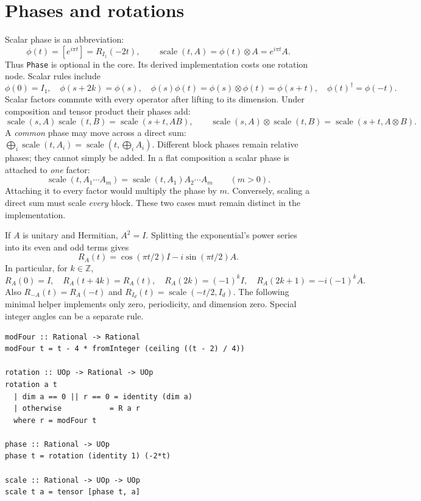 \documentclass[11pt,a4paper]{article}
\newcommand{\code}[1]{\texttt{#1}}
\newcommand{\Rot}[2]{R_{#1}(#2)}
\newcommand{\Ph}[1]{\phi(#1)}
\begin{document}
\section{Phases and rotations}

\label{sec:phases}

Scalar phase is an abbreviation:
\[
 \Ph t=[e^{i\pi t}]=\Rot{I_1}{-2t},
 \qquad \operatorname{scale}(t,A)=\Ph t\otimes A=e^{i\pi t}A.
\]
Thus \code{Phase} is optional in the core. Its derived implementation
costs one rotation node. Scalar rules include
\[
 \Ph0=I_1,\quad \Ph{s+2k}=\Ph s,\quad
 \Ph s\Ph t=\Ph s\otimes\Ph t=\Ph{s+t},\quad
 \Ph t^\dagger=\Ph{-t}.
\]
Scalar factors commute with every operator after lifting to its
dimension. Under composition and tensor product their phases add:
\[
 \operatorname{scale}(s,A)\operatorname{scale}(t,B)
   =\operatorname{scale}(s+t,AB),\qquad
 \operatorname{scale}(s,A)\otimes\operatorname{scale}(t,B)
   =\operatorname{scale}(s+t,A\otimes B).
\]
A \emph{common} phase may move across a direct sum:
$\bigoplus_i\operatorname{scale}(t,A_i)
=\operatorname{scale}(t,\bigoplus_i A_i)$.
Different block phases remain relative phases; they cannot simply be added.
In a flat composition a scalar phase is attached to \emph{one} factor:
\[
 \operatorname{scale}(t,A_1\cdots A_m)
 =\operatorname{scale}(t,A_1)A_2\cdots A_m\qquad(m>0).
\]
Attaching it to every factor would multiply the phase by $m$. Conversely,
scaling a direct sum must scale \emph{every} block. These two cases must
remain distinct in the implementation.

If $A$ is unitary and Hermitian, $A^2=I$. Splitting the exponential's
power series into its even and odd terms gives
\begin{equation}
 \Rot A t=\cos(\pi t/2)I-i\sin(\pi t/2)A. \label{eq:involution-exp}
\end{equation}
In particular, for $k\in\mathbb Z$,
\[
 \Rot A0=I,\quad \Rot A{t+4k}=\Rot At,\quad
 \Rot A{2k}=(-1)^kI,\quad \Rot A{2k+1}=-i(-1)^kA.
\]
Also $R_{-A}(t)=R_A(-t)$ and
$R_{I_d}(t)=\operatorname{scale}(-t/2,I_d)$.
The following minimal helper implements only zero, periodicity, and
dimension zero. Special integer angles can be a separate rule.

\begin{lstlisting}
modFour :: Rational -> Rational
modFour t = t - 4 * fromInteger (ceiling ((t - 2) / 4))

rotation :: UOp -> Rational -> UOp
rotation a t
  | dim a == 0 || r == 0 = identity (dim a)
  | otherwise           = R a r
  where r = modFour t

phase :: Rational -> UOp
phase t = rotation (identity 1) (-2*t)

scale :: Rational -> UOp -> UOp
scale t a = tensor [phase t, a]
\end{lstlisting}
\end{document}

